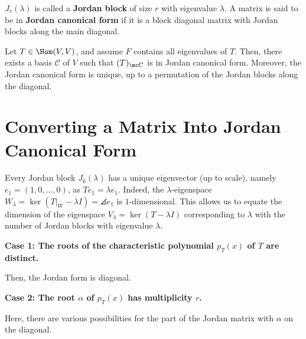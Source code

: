 \begin{defn}
    $J_r(\lambda)$ is called a \textbf{Jordan block} of size $r$ with eigenvalue $\lambda$. A matrix is said to be in \textbf{Jordan canonical form} if it is a block diagonal matrix with Jordan blocks along the main diagonal.
\end{defn}

\begin{thm}
    Let $T \in \Hom(V,V)$, and assume $F$ contains all eigenvalues of $T$. Then, there exists a basis $\mathcal C$ of $V$ such that $(T)_{\mc C}$ is in Jordan canonical form. Moreover, the Jordan canonical form is unique, up to a permutation of the Jordan blocks along the diagonal.
\end{thm}

\section{Converting a Matrix Into Jordan Canonical Form}

\begin{rmk}
    Every Jordan block $J_k(\lambda)$ has a unique eigenvector (up to scale), namely $e_1 = (1,0,\dots,0)$, as $Te_1 = \lambda e_1$. Indeed, the $\lambda$-eigenspace $W_\lambda = \ker (T|_W - \lambda I) = \angles {e_1}$ is $1$-dimensional. This allows us to equate the dimension of the eigenspace $V_\lambda=\ker (T-\lambda I)$ corresponding to $\lambda$ with the number of Jordan blocks with eigenvalue $\lambda$.
\end{rmk}

\textbf{Case 1: The roots of the characteristic polynomial $p_T(x)$ of $T$ are distinct.}

Then, the Jordan form is diagonal.

\textbf{Case 2: The root $\alpha$ of $p_T(x)$ has multiplicity $r$.}

Here, there are various possibilities for the part of the Jordan matrix with $\alpha$ on the diagonal.

